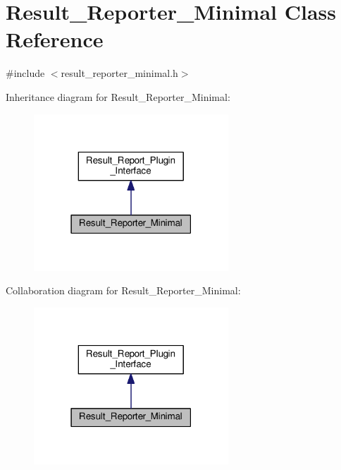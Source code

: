 \hypertarget{classResult__Reporter__Minimal}{}\section{Result\+\_\+\+Reporter\+\_\+\+Minimal Class Reference}
\label{classResult__Reporter__Minimal}


{\ttfamily \#include $<$result\+\_\+reporter\+\_\+minimal.\+h$>$}



Inheritance diagram for Result\+\_\+\+Reporter\+\_\+\+Minimal\+:\nopagebreak
\begin{figure}[H]
\begin{center}
\leavevmode
\includegraphics[width=207pt]{classResult__Reporter__Minimal__inherit__graph}
\end{center}
\end{figure}


Collaboration diagram for Result\+\_\+\+Reporter\+\_\+\+Minimal\+:\nopagebreak
\begin{figure}[H]
\begin{center}
\leavevmode
\includegraphics[width=207pt]{classResult__Reporter__Minimal__coll__graph}
\end{center}
\end{figure}
